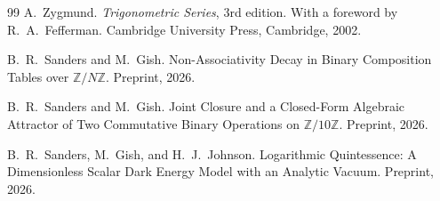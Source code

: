 \documentclass[11pt,reqno]{amsart}
\theoremstyle{plain}
\theoremstyle{definition}
\theoremstyle{remark}
\begin{document}
\begin{thebibliography}{99}
A.~Zygmund.
\newblock \emph{Trigonometric Series}, 3rd edition.
\newblock With a foreword by R.~A.~Fefferman.
Cambridge University Press, Cambridge, 2002.

B.~R.~Sanders and M.~Gish.
\newblock Non-Associativity Decay in Binary Composition Tables over
$\mathbb{Z}/N\mathbb{Z}$.
\newblock Preprint, 2026.

B.~R.~Sanders and M.~Gish.
\newblock Joint Closure and a Closed-Form Algebraic Attractor of Two
Commutative Binary Operations on $\mathbb{Z}/10\mathbb{Z}$.
\newblock Preprint, 2026.

B.~R.~Sanders, M.~Gish, and H.~J.~Johnson.
\newblock Logarithmic Quintessence: A Dimensionless Scalar Dark Energy
Model with an Analytic Vacuum.
\newblock Preprint, 2026.

\end{thebibliography}
\end{document}
